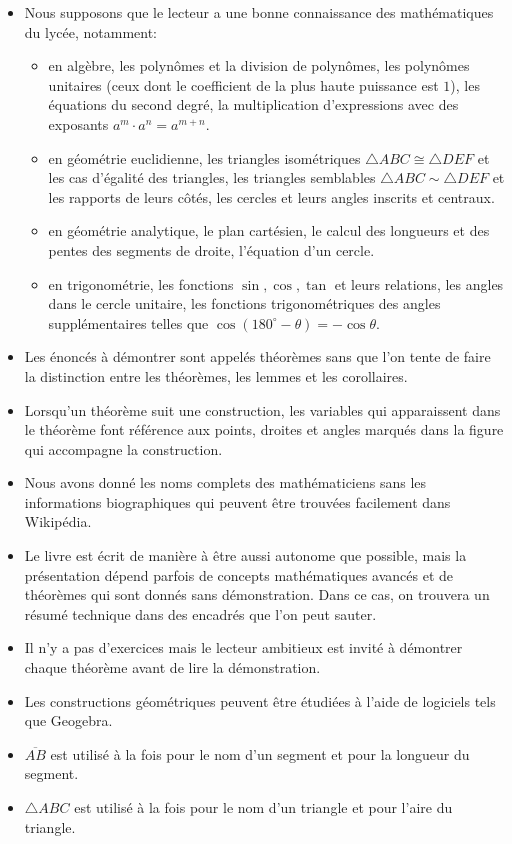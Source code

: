 \begin{itemize}
\item Nous supposons que le lecteur a une bonne connaissance des mathématiques du lycée, notamment: 
\begin{itemize}
\item en algèbre, les polynômes et la division de polynômes, les polynômes {unitaires} (ceux dont le coefficient de la plus haute puissance est $1$), les équations du second degré, la multiplication d'expressions avec des exposants $a^m\cdot a^n=a^{m+n}$.
\item en géométrie euclidienne, les  triangles isométriques  $\triangle ABC \cong \triangle DEF$ et les cas d'égalité des triangles, les triangles semblables $\triangle ABC \sim \triangle DEF$ et les rapports de leurs côtés, les cercles et leurs angles inscrits et centraux.
\item en géométrie analytique, le plan cartésien, le calcul des longueurs et des pentes des segments de droite, l'équation d'un cercle.
\item en trigonométrie, les fonctions $\sin,\cos,\tan$ et leurs relations, les angles dans le cercle unitaire, les fonctions trigonométriques des angles supplémentaires telles que $\cos (180^\circ-\theta)=-\cos\theta$.
\end{itemize}
\item Les énoncés à démontrer sont appelés \og théorèmes\fg{} sans que l'on tente de faire la distinction entre les théorèmes, les lemmes et les corollaires.
\item Lorsqu'un théorème suit une construction, les variables qui apparaissent dans le théorème font référence aux points, droites et angles marqués dans la figure qui accompagne la construction.
\item Nous avons donné les noms complets des mathématiciens sans les informations biographiques qui peuvent être trouvées facilement dans Wikipédia.
\item Le livre est écrit de manière à être aussi autonome que possible, mais la présentation dépend parfois de concepts mathématiques avancés et de théorèmes qui sont donnés sans démonstration. Dans ce cas, on trouvera un résumé technique dans des encadrés que l'on peut sauter.
\item Il n'y a pas d'exercices mais le lecteur ambitieux est invité à démontrer chaque théorème avant de lire la démonstration.
\item Les constructions géométriques peuvent être étudiées à l'aide de logiciels tels que {Geogebra}.
\item  $\overline{AB}$ est utilisé à la fois pour le nom d'un segment  et pour la longueur du segment.
\item $\triangle ABC$ est utilisé à la fois pour le nom d'un triangle et pour l'aire du triangle.
\end{itemize}


